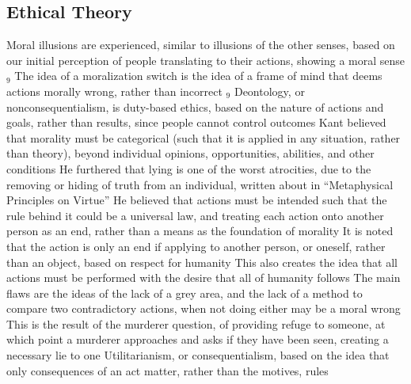 \documentclass[11 pt, twoside]{article}
\newenvironment{outline*}
{
	\begin{outline}[enumerate]
	}
	{\end{outline}
}
\newcommand{\foota}[1]{\hyperlink{#1}{$_#1$}}
\begin{document}
\subsection{Ethical Theory}
\begin{outline*}
\1 Moral illusions are experienced, similar to illusions of the other senses, based on our initial perception of people translating to their actions, showing a moral sense \foota{9}
\1 The idea of a moralization switch is the idea of a frame of mind  that deems actions morally wrong, rather than incorrect \foota{9}
\1 Deontology, or nonconsequentialism, is duty-based ethics, based on the nature of actions and goals, rather than results, since people cannot control outcomes
\2 Kant believed that morality must be categorical (such that it is applied in any situation, rather than theory), beyond individual opinions, opportunities, abilities, and other conditions
\3 He furthered that lying is one of the worst atrocities, due to the removing or hiding of truth from an individual, written about in ``Metaphysical Principles on Virtue''
\2 He believed that actions must be intended such that the rule behind it could be a universal law, and treating each action onto another person as an end, rather than a means as the foundation of morality
\3 It is noted that the action is only an end if applying to another person, or oneself, rather than an object, based on respect for humanity
\3 This also creates the idea that all actions must be performed with the desire that all of humanity follows
\2 The main flaws are the ideas of the lack of a grey area, and the lack of a method to compare two contradictory actions, when not doing either may be a moral wrong
\3 This is the result of the murderer question, of providing refuge to someone, at which point a murderer approaches and asks if they have been seen, creating a necessary lie to one
\1 Utilitarianism, or consequentialism, based on the idea that only consequences of an act matter, rather than the motives, rules 
\end{outline*}
\end{document}
